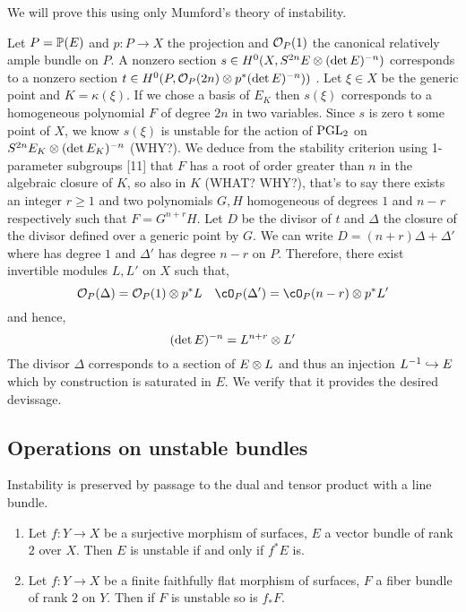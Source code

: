 \documentclass[12pt]{article}
\begin{document}
We will prove this using only Mumford's theory of instability.
\par 
Let $P = \P(E)$ and $p : P \to X$ the projection and $\struct{P}(1)$ the canonical relatively ample bundle on $P$. A nonzero section $s \in H^0(X, S^{2n} E \ot (\det{E})^{-n})$ corresponds to a nonzero section $t \in H^0(P, \struct{P}(2n) \ot p^* (\det{E})^{-n}))$ . Let $\xi \in X$ be the generic point and $K = \kappa(\xi)$. If we chose a basis of $E_K$ then $s(\xi)$ corresponds to a homogeneous polynomial $F$ of degree $2n$ in two variables. Since $s$ is zero t some point of $X$, we know $s(\xi)$ is unstable for the action of $\PGL_2$ on $S^{2n} E_K \ot (\det{E_K})^{-n}$ (WHY?). We deduce from the stability criterion using 1-parameter subgroups [11] that $F$ has a root of order greater than $n$ in the algebraic closure of $K$, so also in $K$ (WHAT? WHY?), that's to say there exists an integer $r \ge 1$ and two polynomials $G, H$ homogeneous of degrees $1$ and $n-r$ respectively such that $F = G^{n+r} H$. Let $D$ be the divisor of $t$ and $\Delta$ the closure of the divisor defined over a generic point by $G$. We can write $D = (n + r) \Delta + \Delta'$ where has degree $1$ and $\Delta'$ has degree $n - r$ on $P$. Therefore, there exist invertible modules $L, L'$ on $X$ such that,
\[ \struct{P}(\Delta) = \struct{P}(1) \ot p^* L \quad \cO_P(\Delta') = \cO_P(n-r) \ot p^* L' \]
and hence,
\[ (\det{E})^{-n} = L^{n+r} \ot L' \]
The divisor $\Delta$ corresponds to a section of $E \ot L$ and thus an injection $L^{-1} \embed E$ which by construction is saturated in $E$. We verify that it provides the desired devissage. 


\subsection{Operations on unstable bundles}

Instability is preserved by passage to the dual and tensor product with a line bundle. 

\begin{enumerate}
\item Let $f : Y \to X$ be a surjective morphism of surfaces, $E$ a vector bundle of rank $2$ over $X$. Then $E$ is unstable if and only if $f^* E$ is. 

\item Let $f : Y \to X$ be a finite faithfully flat morphism of surfaces, $F$ a fiber bundle of rank $2$ on $Y$. Then if $F$ is unstable so is $f_* F$.
\end{enumerate}
\end{document}
